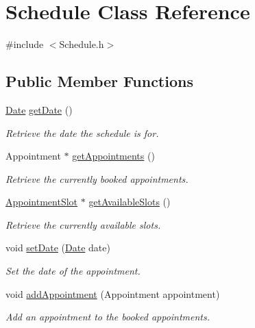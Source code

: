 \hypertarget{classSchedule}{\section{Schedule Class Reference}
\label{classSchedule}
}


{\ttfamily \#include $<$Schedule.\-h$>$}

\subsection*{Public Member Functions}
\begin{DoxyCompactItemize}
\item 
\hyperlink{structDate}{Date} \hyperlink{classSchedule_afdf91c885aeba022140a9cfb5a9c1ba4}{get\-Date} ()
\begin{DoxyCompactList}\small\item\em Retrieve the date the schedule is for. \end{DoxyCompactList}\item 
Appointment $\ast$ \hyperlink{classSchedule_a86714dcdba5007e5627fd07996bd64ea}{get\-Appointments} ()
\begin{DoxyCompactList}\small\item\em Retrieve the currently booked appointments. \end{DoxyCompactList}\item 
\hyperlink{classAppointmentSlot}{Appointment\-Slot} $\ast$ \hyperlink{classSchedule_a621cc493f30f6b4aa5de332b0e60c800}{get\-Available\-Slots} ()
\begin{DoxyCompactList}\small\item\em Retrieve the currently available slots. \end{DoxyCompactList}\item 
void \hyperlink{classSchedule_a218335a66a3e2345dc249e7c951aa437}{set\-Date} (\hyperlink{structDate}{Date} date)
\begin{DoxyCompactList}\small\item\em Set the date of the appointment. \end{DoxyCompactList}\item 
void \hyperlink{classSchedule_a8406c2157c04cfdc6b6946ab0a2ab6cb}{add\-Appointment} (Appointment appointment)
\begin{DoxyCompactList}\small\item\em Add an appointment to the booked appointments. \end{DoxyCompactList}\item 

\end{DoxyCompactItemize}
